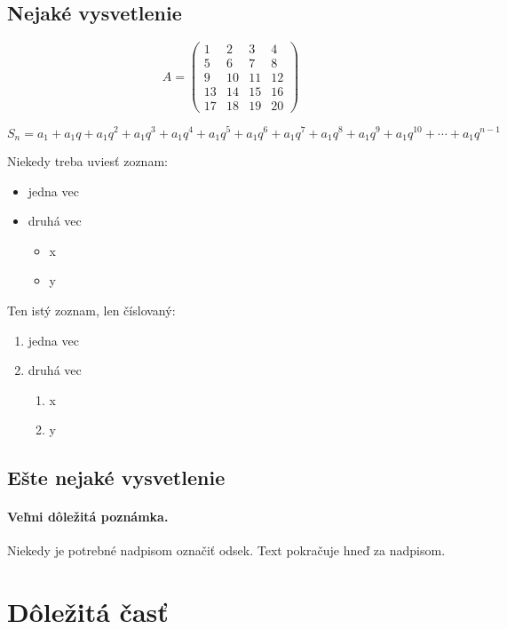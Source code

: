 \documentclass[10pt,twocolumn,twoside,slovak,a4paper]{article}
\begin{document}
\subsection{Nejaké vysvetlenie} \label{ina:nejake}

\[
A =
\begin{pmatrix}
1 & 2 & 3 & 4 \\
5 & 6 & 7 & 8 \\
9 & 10 & 11 & 12 \\
13 & 14 & 15 & 16 \\
17 & 18 & 19 & 20
\end{pmatrix}
\]

\[
S_n = a_1 + a_1q + a_1q^2 + a_1q^3 + a_1q^4 + a_1q^5 + a_1q^6 + a_1q^7 + a_1q^8 + a_1q^9 + a_1q^{10} + \cdots + a_1q^{n-1}
\]

Niekedy treba uviesť zoznam:

\begin{itemize}
\item jedna vec
\item druhá vec
	\begin{itemize}
	\item x
	\item y
	\end{itemize}
\end{itemize}

Ten istý zoznam, len číslovaný:

\begin{enumerate}
\item jedna vec
\item druhá vec
	\begin{enumerate}
	\item x
	\item y
	\end{enumerate}
\end{enumerate}


\subsection{Ešte nejaké vysvetlenie} \label{ina:este}

\paragraph{Veľmi dôležitá poznámka.}
Niekedy je potrebné nadpisom označiť odsek. Text pokračuje hneď za nadpisom.



\section{Dôležitá časť} \label{dolezita}
\end{document}
